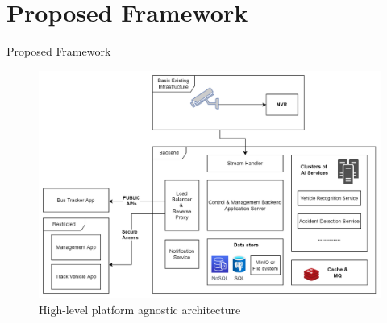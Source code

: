 \documentclass{beamer}
\begin{document}
\section{Proposed Framework}
\begin{frame}{Proposed Framework}
	\begin{figure}
        \includegraphics[width=0.8\linewidth]{res/architecture.png}
        \caption{High-level platform agnostic architecture}
    \end{figure}
\end{frame}


\end{document}
